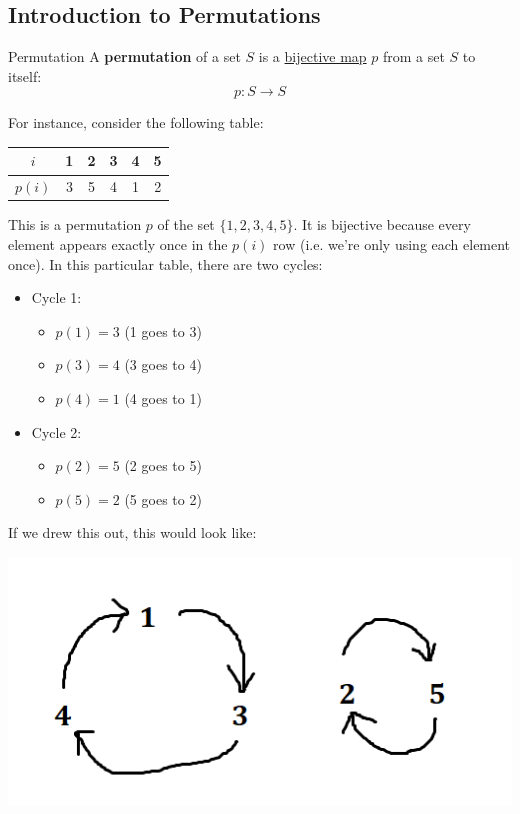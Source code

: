 \documentclass[letterpaper]{article}
\begin{document}
\subsection{Introduction to Permutations}
\begin{definition}{Permutation}{}
    A \textbf{permutation} of a set $S$ is a \underline{bijective map} $p$ from a set $S$ to itself: 
    \[p: S \to S\]
\end{definition}
For instance, consider the following table: 
\begin{center}
    \begin{tabular}{|c|c c c c c|}
        \hline 
        $i$ & 1 & 2 & 3 & 4 & 5 \\ 
        \hline 
        $p(i)$ & 3 & 5 & 4 & 1 & 2 \\ 
        \hline 
    \end{tabular}
\end{center}
This is a permutation $p$ of the set $\{1, 2, 3, 4, 5\}$. It is bijective because every element appears exactly once in the $p(i)$ row (i.e. we're only using each element once). In this particular table, there are two cycles:
\begin{itemize}
    \item Cycle 1: 
    \begin{itemize}
        \item $p(1) = 3$ (1 goes to 3)
        \item $p(3) = 4$ (3 goes to 4)
        \item $p(4) = 1$ (4 goes to 1)
    \end{itemize}
    \item Cycle 2: 
    \begin{itemize}
        \item $p(2) = 5$ (2 goes to 5)
        \item $p(5) = 2$ (5 goes to 2)
    \end{itemize}
\end{itemize}
If we drew this out, this would look like: 
\begin{center}
    \includegraphics[scale=0.7]{assets/permutation_134_25.png}
\end{center}
\end{document}
